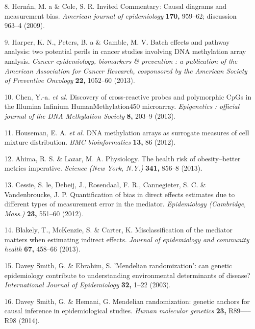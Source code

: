 \documentclass[]{article}
\begin{document}
\hypertarget{ref-Hernan2009}{}
8. Hernán, M. a \& Cole, S. R. Invited Commentary: Causal diagrams and
measurement bias. \emph{American journal of epidemiology} \textbf{170,}
959--62; discussion 963--4 (2009).

\hypertarget{ref-Harper2013}{}
9. Harper, K. N., Peters, B. a \& Gamble, M. V. Batch effects and
pathway analysis: two potential perils in cancer studies involving DNA
methylation array analysis. \emph{Cancer epidemiology, biomarkers \&
prevention : a publication of the American Association for Cancer
Research, cosponsored by the American Society of Preventive Oncology}
\textbf{22,} 1052--60 (2013).

\hypertarget{ref-Chen2013a}{}
10. Chen, Y.-a. \emph{et al.} Discovery of cross-reactive probes and
polymorphic CpGs in the Illumina Infinium HumanMethylation450
microarray. \emph{Epigenetics : official journal of the DNA Methylation
Society} \textbf{8,} 203--9 (2013).

\hypertarget{ref-Houseman2012}{}
11. Houseman, E. A. \emph{et al.} DNA methylation arrays as surrogate
measures of cell mixture distribution. \emph{BMC bioinformatics}
\textbf{13,} 86 (2012).

\hypertarget{ref-Ahima2013}{}
12. Ahima, R. S. \& Lazar, M. A. Physiology. The health risk of
obesity--better metrics imperative. \emph{Science (New York, N.Y.)}
\textbf{341,} 856--8 (2013).

\hypertarget{ref-LeCessie2012}{}
13. Cessie, S. le, Debeij, J., Rosendaal, F. R., Cannegieter, S. C. \&
Vandenbroucke, J. P. Quantification of bias in direct effects estimates
due to different types of measurement error in the mediator.
\emph{Epidemiology (Cambridge, Mass.)} \textbf{23,} 551--60 (2012).

\hypertarget{ref-Blakely2013}{}
14. Blakely, T., McKenzie, S. \& Carter, K. Misclassification of the
mediator matters when estimating indirect effects. \emph{Journal of
epidemiology and community health} \textbf{67,} 458--66 (2013).

\hypertarget{ref-DaveySmith2003}{}
15. Davey Smith, G. \& Ebrahim, S. 'Mendelian randomization': can
genetic epidemiology contribute to understanding environmental
determinants of disease? \emph{International Journal of Epidemiology}
\textbf{32,} 1--22 (2003).

\hypertarget{ref-DaveySmithHemani2014}{}
16. Davey Smith, G. \& Hemani, G. Mendelian randomization: genetic
anchors for causal inference in epidemiological studies. \emph{Human
molecular genetics} \textbf{23,} R89-----R98 (2014).
\end{document}
